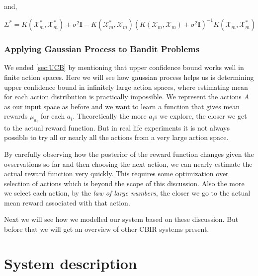 \documentclass[english]{tktltiki}
\begin{document}
and,

\begin{equation}
\Sigma^* = K(\mathcal{X}_m^*, \mathcal{X}_m^*) + \sigma^2 \mathbf{I} - K(\mathcal{X}_m^*, \mathcal{X}_m)(K(\mathcal{X}_m, \mathcal{X}_m) + \sigma^2 \mathbf{I})^{-1} K(\mathcal{X}_m, \mathcal{X}_m^*)
\label{gauss_poster_var}
\end{equation}


\subsubsection{Applying Gaussian Process to Bandit Problems}

We ended \ref{sec:UCB} by mentioning that upper confidence bound works well in finite action spaces. Here we will see how gaussian process helps us is determining upper confidence bound in infinitely large action spaces, where estimating mean for each action distribution is practically impossible. We represent the actions $A$ as our input space as before and we want to learn a function that gives mean rewards $\mu_{a_i}$ for each $a_i$. Theoretically the more $a_i$s we explore, the closer we get to the actual reward function. But in real life experiments it is not always possible to try all or nearly all the actions from a very large action space.



By carefully observing how the posterior of the reward function changes given the ovservations so far and then choosing the next action, we can nearly estimate the actual reward function very quickly. This requires some optimization over selection of actions which is beyond the scope of this discussion. Also the more we select each action, by the \textit{law of large numbers}, the closer we go to the actual mean reward associated with that action.

Next we will see how we modelled our system based on these discussion. But before that we will get an overview of other CBIR systems present.



\section{System description}
\end{document}
